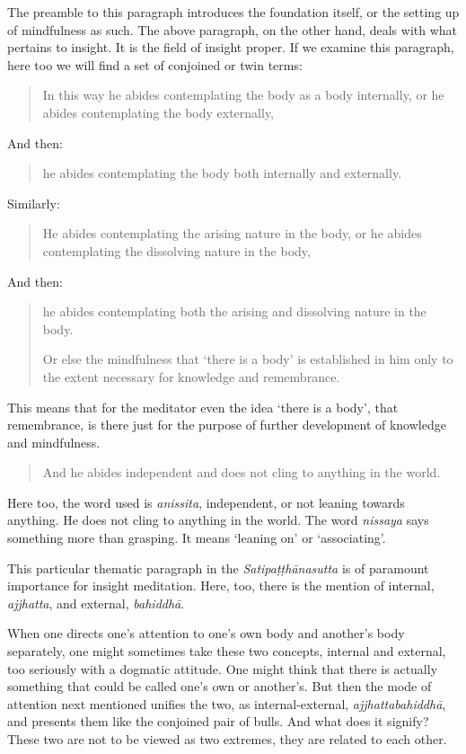 The preamble to this paragraph introduces the foundation itself, or the setting up of mindfulness as such. The above paragraph, on the other hand, deals with what pertains to insight. It is the field of insight proper. If we examine this paragraph, here too we will find a set of conjoined or twin terms:

\begin{quote}
In this way he abides contemplating the body as a body internally, or he abides contemplating the body externally,
\end{quote}

And then:

\begin{quote}
he abides contemplating the body both internally and externally.
\end{quote}

Similarly:

\begin{quote}
He abides contemplating the arising nature in the body, or he abides contemplating the dissolving nature in the body,
\end{quote}

And then:

\begin{quote}
he abides contemplating both the arising and dissolving nature in the body.

Or else the mindfulness that `there is a body' is established in him only to the extent necessary for knowledge and remembrance.
\end{quote}

This means that for the meditator even the idea `there is a body', that remembrance, is there just for the purpose of further development of knowledge and mindfulness.

\begin{quote}
And he abides independent and does not cling to anything in the world.
\end{quote}

Here too, the word used is \emph{anissita}, independent, or not leaning towards anything. He does not cling to anything in the world. The word \emph{nissaya} says something more than grasping. It means `leaning on' or `associating'.

This particular thematic paragraph in the \emph{Satipaṭṭhānasutta} is of paramount importance for insight meditation. Here, too, there is the mention of internal, \emph{ajjhatta}, and external, \emph{bahiddhā}.

When one directs one's attention to one's own body and another's body separately, one might sometimes take these two concepts, internal and external, too seriously with a dogmatic attitude. One might think that there is actually something that could be called one's own or another's. But then the mode of attention next mentioned unifies the two, as internal-external, \emph{ajjhattabahiddhā}, and presents them like the conjoined pair of bulls. And what does it signify? These two are not to be viewed as two extremes, they are related to each other.


